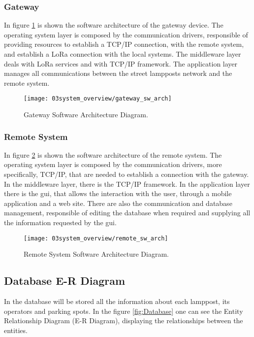 \subsubsection{Gateway}
In figure \ref{fig:gateway_sw_arch} is shown the software architecture of the gateway device. The operating system layer is composed by the communication drivers, responsible of providing resources to establish a TCP/IP connection, with the remote system, and establish a LoRa connection with the local systems. The middleware layer deals with LoRa services and with TCP/IP framework. The application layer manages all communications between the street lampposts network and the remote system.

\begin{figure}[H]
	\centering
	\texttt{[image: 03system\_overview/gateway\_sw\_arch]}
	\caption{Gateway Software Architecture Diagram.}
	\label{fig:gateway_sw_arch}
\end{figure}

\clearpage
\subsubsection{Remote System}
In figure \ref{fig:remote_sw_arch} is shown the software architecture of the remote system. The operating system layer is composed by the communication drivers, more specifically, TCP/IP, that are needed to establish a connection with the gateway. In the middleware layer, there is the TCP/IP framework.
In the application layer there is the \ac{gui}, that allows the interaction with the user, through a mobile application and a web site. There are also the communication and database management, responsible of editing the database when required and supplying all the information requested by the \ac{gui}.

\begin{figure}[H]
	\centering
	\texttt{[image: 03system\_overview/remote\_sw\_arch]}
	\caption{Remote System Software Architecture Diagram.}
	\label{fig:remote_sw_arch}
\end{figure}

\clearpage
\subsection{Database E-R Diagram}
In the database will be stored all the information about each lamppost, its operators and parking spots. In the figure \ref{fig:Database} one can see the Entity Relationship Diagram (E-R Diagram), displaying the relationships between the entities.

